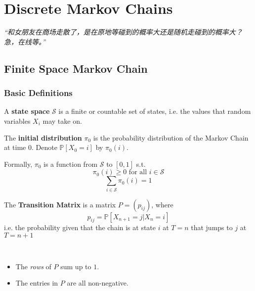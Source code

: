 \chapter{Discrete Markov Chains}
\emph{“和女朋友在商场走散了，是在原地等碰到的概率大还是随机走碰到的概率大？急，在线等。”}
\newpage

\section{Finite Space Markov Chain}

\subsection{Basic Definitions}
\begin{definition}
    A \textbf{state space} $\mathcal{S}$ is a finite or countable set of states, i.e. the values that random variables $X_i$ may take on.
\end{definition}
\begin{definition}
    The \textbf{initial distribution} $\pi_0$ is the probability distribution of the Markov Chain at time $0$. Denote $\mathbb{P}[X_0 = i]$ by $\pi_0(i)$.
\end{definition}
\begin{remark}
    Formally, $\pi_0$ is a function from $\mathcal{S}$ to $[0,1]$ s.t.
    \[ \pi_0(i) \ge 0 \text{ for all $i\in\mathcal{S}$} \]
    \[ \sum_{i\in\mathcal{S}} \pi_0(i) = 1\]
\end{remark}
\begin{definition}
    The \textbf{Transition Matrix} is a matrix $P = (p_{ij})$, where
    \[ p_{ij} = \mathbb{P}[X_{n+1} = j | X_n = i] \]
    i.e. the probability given that the chain is at state $i$ at $T=n$ that jumps to $j$ at $T=n+1$
\end{definition}
\begin{remark}
    ~{}
    \begin{itemize}
        \item The \emph{rows} of $P$ sum up to $1$.
        \item The entries in $P$ are all non-negative.
    \end{itemize}
\end{remark}

